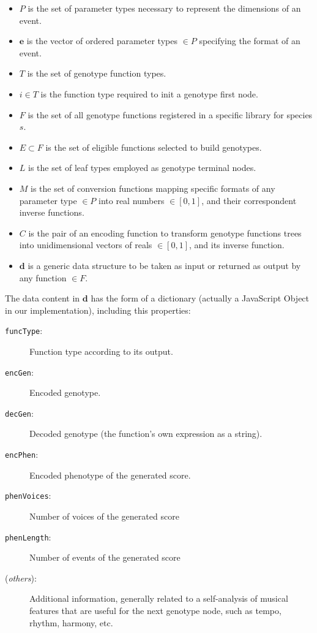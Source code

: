 \documentclass{article}
\renewcommand{\vec}[1]{\mathbf{#1}}
\begin{document}
\begin{itemize}
\item $P$ is the set of parameter types necessary to represent the dimensions of an event.
\item $\vec{e}$ is the vector of ordered parameter types $\in P$ specifying the format of an event. 
\item $T$ is the set of genotype function types. 
\item $i \in T$ is the function type required to init a genotype first node.
\item $F$ is the set of all genotype functions registered in a specific library for species $s$.
\item $E \subset F$ is the set of eligible functions selected to build genotypes.
\item $L$ is the set of leaf types employed as genotype terminal nodes.
\item $M$ is the set of conversion functions mapping specific formats of any parameter type $\in P$ into real numbers $\in [0,1]$, and their correspondent inverse functions.
\item $C$ is the pair of an encoding function to transform genotype functions trees into unidimensional vectors of reals $\in [0,1]$, and its inverse function.
\item $\vec{d}$ is a generic data structure to be taken as input or returned as output by any function $\in F$.
\end{itemize}

The data content in $\vec{d}$ has the form of a dictionary (actually a JavaScript Object in our implementation), including this properties:

\begin{description}
\item[\texttt{funcType}:] Function type according to its output.
\item[\texttt{encGen}:] Encoded genotype. 
\item[\texttt{decGen}:] Decoded genotype (the function's own expression as a string).
\item[\texttt{encPhen}:] Encoded phenotype of the generated score.
\item[\texttt{phenVoices}:] Number of voices of the generated score
\item[\texttt{phenLength}:] Number of events of the generated score
\item[(\emph{others}):] Additional information, generally related to a self-analysis of musical features that are useful for the next genotype node, such as tempo, rhythm, harmony, etc.

\end{description}
\end{document}
